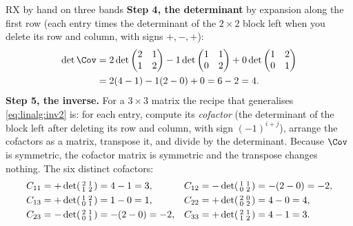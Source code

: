 \begin{worked}[label={we:rx:three}]{RX by hand on three bands}
\textbf{Step 4, the determinant} by expansion along the first row (each entry times the determinant
of the $2\times2$ block left when you delete its row and column, with signs $+,-,+$):
\begin{align*}
\det\Cov &= 2\det\begin{pmatrix} 2 & 1\\ 1 & 2\end{pmatrix}
  - 1\det\begin{pmatrix} 1 & 1\\ 0 & 2\end{pmatrix}
  + 0\det\begin{pmatrix} 1 & 2\\ 0 & 1\end{pmatrix}\\
&= 2(4 - 1) - 1(2 - 0) + 0 = 6 - 2 = 4 .
\end{align*}
\textbf{Step 5, the inverse.} For a $3\times3$ matrix the recipe that generalises
\cref{eq:linalg:inv2} is: for each entry, compute its \emph{cofactor} (the determinant of the block
left after deleting its row and column, with sign $(-1)^{i+j}$), arrange the cofactors as a matrix,
transpose it, and divide by the determinant. Because $\Cov$ is symmetric, the cofactor matrix is
symmetric and the transpose changes nothing. The six distinct cofactors:
\begin{align*}
C_{11} &= +\det\begin{psmallmatrix} 2 & 1\\ 1 & 2\end{psmallmatrix} = 4 - 1 = 3, &
C_{12} &= -\det\begin{psmallmatrix} 1 & 1\\ 0 & 2\end{psmallmatrix} = -(2 - 0) = -2,\\
C_{13} &= +\det\begin{psmallmatrix} 1 & 2\\ 0 & 1\end{psmallmatrix} = 1 - 0 = 1, &
C_{22} &= +\det\begin{psmallmatrix} 2 & 0\\ 0 & 2\end{psmallmatrix} = 4 - 0 = 4,\\
C_{23} &= -\det\begin{psmallmatrix} 2 & 1\\ 0 & 1\end{psmallmatrix} = -(2 - 0) = -2, &
C_{33} &= +\det\begin{psmallmatrix} 2 & 1\\ 1 & 2\end{psmallmatrix} = 4 - 1 = 3 .

\end{align*}
\end{worked}
